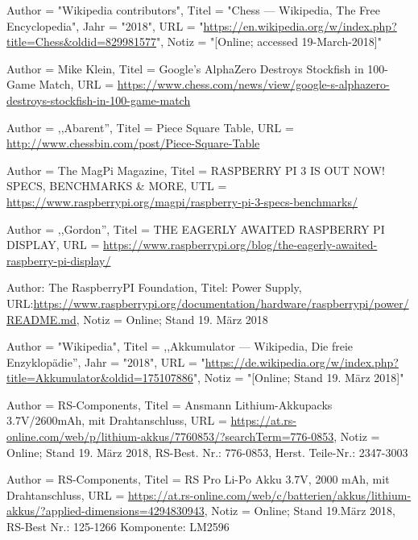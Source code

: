 \documentclass[12pt,a4paper]{article}
\begin{document}
{\begingroup
\renewcommand{\section}[2]{}
\begin{thebibliography}{}
    Author = "Wikipedia contributors",
    Titel = "Chess --- Wikipedia{,} The Free Encyclopedia",
    Jahr = "2018",
    URL = "\url{https://en.wikipedia.org/w/index.php?title=Chess&oldid=829981577}",
    Notiz = "[Online; accessed 19-March-2018]"
    
    	Author = Mike Klein, Titel = Google's AlphaZero Destroys Stockfish in 100-Game Match, 
    	URL = \url{https://www.chess.com/news/view/google-s-alphazero-destroys-stockfish-in-100-game-match}
	
	Author = ,,Abarent'', Titel = Piece Square Table, URL = \url{http://www.chessbin.com/post/Piece-Square-Table}    	
	
	Author = The MagPi Magazine, Titel = RASPBERRY PI 3 IS OUT NOW! SPECS, BENCHMARKS \& MORE, 
	UTL = \url{https://www.raspberrypi.org/magpi/raspberry-pi-3-specs-benchmarks/}
	
	Author = ,,Gordon'', Titel = THE EAGERLY AWAITED RASPBERRY PI DISPLAY, 
	URL = \url{https://www.raspberrypi.org/blog/the-eagerly-awaited-raspberry-pi-display/}
    	
		Author: The RaspberryPI Foundation, Titel: Power Supply,
		URL:\url{https://www.raspberrypi.org/documentation/hardware/raspberrypi/power/README.md},
		Notiz = Online; Stand 19. März 2018
		
	 Author = "Wikipedia",
   Titel = ,,Akkumulator --- Wikipedia{,} Die freie Enzyklopädie'',
   Jahr = "2018",
   URL = "\url{https://de.wikipedia.org/w/index.php?title=Akkumulator&oldid=175107886}",
   Notiz = "[Online; Stand 19. März 2018]"
   
   Author = RS-Components,
   Titel = Ansmann Lithium-Akkupacks 3.7V/2600mAh, mit Drahtanschluss,
   URL = \url{https://at.rs-online.com/web/p/lithium-akkus/7760853/?searchTerm=776-0853},
	Notiz = Online; Stand 19. März 2018,
	RS-Best. Nr.: 776-0853,
	Herst. Teile-Nr.: 2347-3003
	
	Author = RS-Components,
	Titel = RS Pro Li-Po Akku 3.7V, 2000 mAh, mit Drahtanschluss,
	URL = \url{https://at.rs-online.com/web/c/batterien/akkus/lithium-akkus/?applied-dimensions=4294830943},
	Notiz = Online; Stand 19.März 2018,
	RS-Best Nr.: 125-1266
	Komponente: LM2596
	

\end{thebibliography}}
\end{document}
